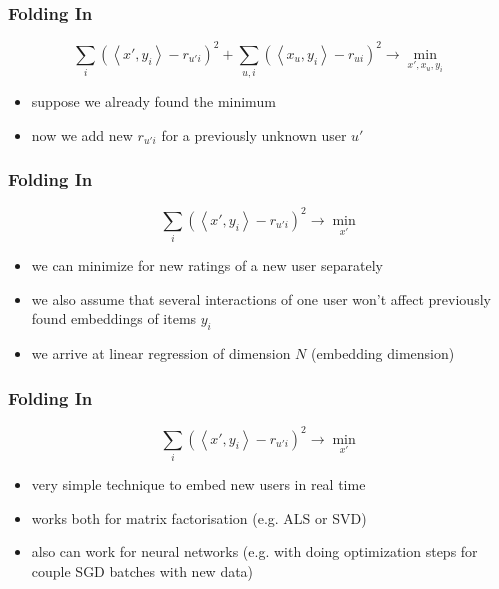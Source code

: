 \documentclass[t]{beamer}
\begin{document}
\begin{frame}
  \frametitle{Folding In}
  $$\sum\limits_i\left(\left<x',y_i\right>-r_{u'i}\right)^2+\sum\limits_{u,i}\left(\left<x_u,y_i\right>-r_{ui}\right)^2\longrightarrow\min_{x',x_u,y_i}$$
  \begin{itemize}
  \item suppose we already found the minimum
  \item now we add new $r_{u'i}$ for a previously unknown user $u'$
  \end{itemize}  
\end{frame}
\begin{frame}
  \frametitle{Folding In}
  $$\sum\limits_i\left(\left<x',y_i\right>-r_{u'i}\right)^2\longrightarrow\min_{x'}$$
  \begin{itemize}
  \item we can minimize for new ratings of a new user separately
  \item we also assume that several interactions of one user won't affect previously found embeddings of items $y_i$
  \item we arrive at linear regression of dimension $N$ (embedding dimension)
  \end{itemize}  
\end{frame}
\begin{frame}
  \frametitle{Folding In}
  $$\sum\limits_i\left(\left<x',y_i\right>-r_{u'i}\right)^2\longrightarrow\min_{x'}$$
  \begin{itemize}
  \item very simple technique to embed new users in real time
  \item works both for matrix factorisation (e.g. ALS or SVD)
  \item also can work for neural networks (e.g. with doing optimization steps for couple SGD batches with new data)
  \end{itemize}
\end{frame}
\end{document}
